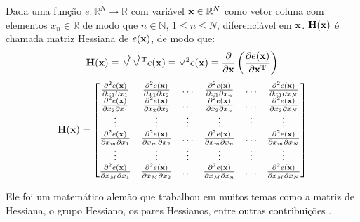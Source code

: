 \begin{proposition}\label{def:hessian}
 Dada uma função $e:\mathbb{R}^{N}\rightarrow \mathbb{R}$ com variável $\VECTOR{x} \in \mathbb{R}^{N}$
 como vetor coluna  com elementos $x_n\in \mathbb{R}$ de modo que $n\in \mathbb{N}$, $1 \leq n \leq N$,
 diferenciável em $\VECTOR{x}$. 
 $\MATRIX{H}(\VECTOR{x})$ é chamada matriz Hessiana \cite[pp. 150]{zhang2017matrix} \cite{Hessian} 
 de $e(\VECTOR{x})$, de modo que: 
\begin{equation}
  \MATRIX{H}(\VECTOR{x}) \equiv  \overrightarrow{\triangledown} \overrightarrow{\triangledown}^{\transpose}e(\VECTOR{x}) \equiv  
\triangledown^2 e(\VECTOR{x}) \equiv \frac{\partial }{\partial \VECTOR{x}} \left( \frac{\partial e(\VECTOR{x})}{ \partial \VECTOR{x}^{\transpose} }\right) 
\end{equation}
 \begin{equation}
  \MATRIX{H}(\VECTOR{x}) =
\left[
\begin{matrix}
\frac{\partial^2 e(\VECTOR{x}) }{\partial x_{1}\partial x_{1}}&
\frac{\partial^2 e(\VECTOR{x}) }{\partial x_{1}\partial x_{2}}&
\hdots&
\frac{\partial^2 e(\VECTOR{x}) }{\partial x_{1}\partial x_{n}}&
\hdots&
\frac{\partial^2 e(\VECTOR{x}) }{\partial x_{1}\partial x_{N}}\\
\frac{\partial^2 e(\VECTOR{x}) }{\partial x_{2}\partial x_{1}}&
\frac{\partial^2 e(\VECTOR{x}) }{\partial x_{2}\partial x_{2}}&
\hdots&
\frac{\partial^2 e(\VECTOR{x}) }{\partial x_{2}\partial x_{n}}&
\hdots&
\frac{\partial^2 e(\VECTOR{x}) }{\partial x_{2}\partial x_{N}}\\
\vdots&
\vdots&
\vdots&
\vdots&
\vdots&
\vdots\\
\frac{\partial^2 e(\VECTOR{x}) }{\partial x_{m}\partial x_{1}}&
\frac{\partial^2 e(\VECTOR{x}) }{\partial x_{m}\partial x_{2}}&
\hdots&
\frac{\partial^2 e(\VECTOR{x}) }{\partial x_{m}\partial x_{n}}&
\hdots&
\frac{\partial^2 e(\VECTOR{x}) }{\partial x_{m}\partial x_{N}}\\
\vdots&
\vdots&
\vdots&
\vdots&
\vdots&
\vdots\\
\frac{\partial^2 e(\VECTOR{x}) }{\partial x_{M}\partial x_{1}}&
\frac{\partial^2 e(\VECTOR{x}) }{\partial x_{M}\partial x_{2}}&
\hdots&
\frac{\partial^2 e(\VECTOR{x}) }{\partial x_{M}\partial x_{n}}&
\hdots&
\frac{\partial^2 e(\VECTOR{x}) }{\partial x_{M}\partial x_{N}}\\
\end{matrix}
\right]
 \end{equation}
\end{proposition}



\begin{elaboracion}[title=Ludwig Otto Hesse (1811-1874), width= 0.99\linewidth]
Ele foi um matemático alemão que trabalhou em muitos temas como a matriz de Hessiana, 
o grupo Hessiano, os pares Hessianos, entre outras contribuições \cite[pp. 261]{agarwal2014creators}.
\end{elaboracion}
